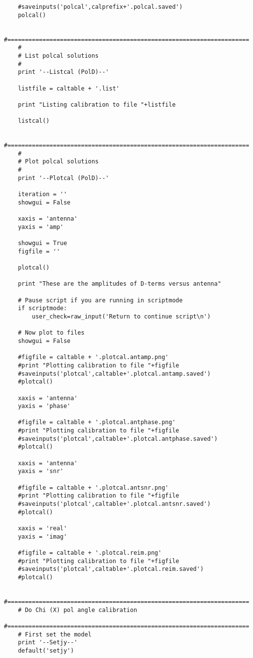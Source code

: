 \begin{verbatim}
    #saveinputs('polcal',calprefix+'.polcal.saved')
    polcal()
    
    #=====================================================================
    #
    # List polcal solutions
    #
    print '--Listcal (PolD)--'

    listfile = caltable + '.list'

    print "Listing calibration to file "+listfile

    listcal()
    
    #=====================================================================
    #
    # Plot polcal solutions
    #
    print '--Plotcal (PolD)--'
    
    iteration = ''
    showgui = False
    
    xaxis = 'antenna'
    yaxis = 'amp'

    showgui = True
    figfile = ''

    plotcal()

    print "These are the amplitudes of D-terms versus antenna"

    # Pause script if you are running in scriptmode
    if scriptmode:
        user_check=raw_input('Return to continue script\n')

    # Now plot to files
    showgui = False

    #figfile = caltable + '.plotcal.antamp.png'
    #print "Plotting calibration to file "+figfile
    #saveinputs('plotcal',caltable+'.plotcal.antamp.saved')
    #plotcal()

    xaxis = 'antenna'
    yaxis = 'phase'

    #figfile = caltable + '.plotcal.antphase.png'
    #print "Plotting calibration to file "+figfile
    #saveinputs('plotcal',caltable+'.plotcal.antphase.saved')
    #plotcal()

    xaxis = 'antenna'
    yaxis = 'snr'

    #figfile = caltable + '.plotcal.antsnr.png'
    #print "Plotting calibration to file "+figfile
    #saveinputs('plotcal',caltable+'.plotcal.antsnr.saved')
    #plotcal()

    xaxis = 'real'
    yaxis = 'imag'

    #figfile = caltable + '.plotcal.reim.png'
    #print "Plotting calibration to file "+figfile
    #saveinputs('plotcal',caltable+'.plotcal.reim.saved')
    #plotcal()

    #=====================================================================
    # Do Chi (X) pol angle calibration
    #=====================================================================
    # First set the model
    print '--Setjy--'
    default('setjy')
        

\end{verbatim}
